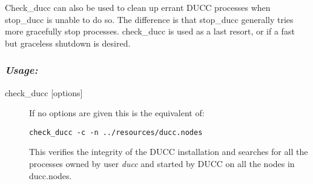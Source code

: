     Check\_ducc can also be used to clean up errant DUCC processes when stop\_ducc is unable 
    to do so. The difference is that stop\_ducc generally tries more gracefully stop processes. 
    check\_ducc is used as a last resort, or if a fast but graceless shutdown is desired. 
    
    \subsubsection{\em{Usage: }}

        \begin{description} 
          \item[check\_ducc {[options]}]
              If no options are given this is the equivalent of: 
\begin{verbatim}
check_ducc -c -n ../resources/ducc.nodes 
\end{verbatim}
              
              This verifies the integrity of the DUCC installation and searches for all the
              processes owned by user {\em ducc} and started by DUCC on all the nodes in ducc.nodes.
        \end{description}
            
